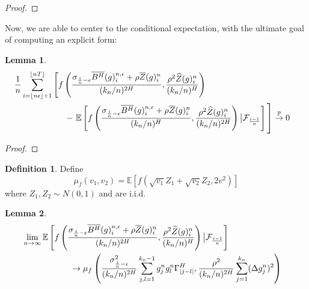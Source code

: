 \documentclass[12pt,letterpaper]{article}
\newtheorem{lemma}{Lemma}
\theoremstyle{definition}
\newtheorem*{definition}{Definition}
\newcommand{\E}{\mathbb{E}}
\begin{document}
\begin{proof}
\end{proof}

Now, we are able to center to the conditional expectation, with the ultimate goal of computing an explicit form:
\begin{lemma}
  \begin{align}
    \phantom{}
    &\begin{aligned}
      \mathllap{} &\frac{1}{n}\sum_{i = \left\lfloor n\epsilon \right\rfloor + 1}^{\left\lfloor nT \right\rfloor} \left[ \vphantom{\E \left[ f\left( \frac{\sigma_{\frac{i}{n}-\epsilon}\overline{B^H}(g)^{n,\epsilon}_i + \rho\overline{Z}(g)^n_i}{(k_n/n)^{2H}}, \frac{\rho^2\widehat{Z}(g)^n_i}{(k_n/n)^H}\right) \right] } f\left( \frac{\sigma_{\frac{i}{n}-\epsilon}\overline{B^H}(g)^{n,\epsilon}_i + \rho\overline{Z}(g)^n_i}{(k_n/n)^{2H}}, \frac{\rho^2\widehat{Z}(g)^n_i}{(k_n/n)^H}\right) \right. \\ &\hspace*{2.1cm} - \left. \E\left[ f\left( \frac{\sigma_{\frac{i}{n}-\epsilon}\overline{B^H}(g)^{n,\epsilon}_i + \rho\overline{Z}(g)^n_i}{(k_n/n)^{H}}, \frac{\rho^2\widehat{Z}(g)^n_i}{(k_n/n)^{2H}}\right) \big| \mathcal{F}_{\frac{i-1}{n}} \right] \vphantom{\frac{1}{n}\sum_{i = \left\lfloor n\epsilon \right\rfloor + 1}^{\left\lfloor nT \right\rfloor}} \right] \overset{\mathbb{P}}{\rightarrow} 0
    \end{aligned}
  \end{align}
\end{lemma}

\begin{proof}
\end{proof}

\begin{definition}
  Define
  \begin{equation}
    \mu_f(v_1, v_2) = \E\left[ f(\sqrt{v_1}Z_1 + \sqrt{v_2}Z_2, 2v^2) \right]
  \end{equation}
  where \(Z_1, Z_2 \sim N(0,1)\) and are i.i.d.
\end{definition}

\begin{lemma}
  \begin{align}
    \phantom{}
    &\begin{aligned}
      \mathllap{} &\lim_{n \rightarrow \infty} \E\left[ f\left( \frac{\sigma_{\frac{i}{n}-\epsilon}\overline{B^H}(g)^{n,\epsilon}_i + \rho\overline{Z}(g)^n_i}{(k_n/n)^{2H}}, \frac{\rho^2\widehat{Z}(g)^n_i}{(k_n/n)^H}\right) \big| \mathcal{F}_{\frac{i-1}{n}} \right] \\
                  &\hspace*{2cm} \rightarrow \mu_f\left( \frac{\sigma^2_{\frac{i}{n}-\epsilon}}{(k_n/n)^{2H}}\sum_{j,l = 1}^{k_n-1} g^n_jg^n_l\Gamma^H_{|j-l|}, \frac{\rho^2}{(k_n/n)^{2H}}\sum_{j=1}^{k_n}(\Delta g^n_j)^2 \right)
    \end{aligned}
  \end{align}
\end{lemma}
\end{document}
